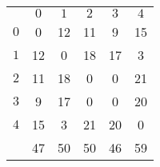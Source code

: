 
\begin{tabular}{c|ccccc|}
 \multicolumn{1}{c}{} & \multicolumn{1}{c}{$0$} & \multicolumn{1}{c}{$1$} 
  & \multicolumn{1}{c}{$2$} & \multicolumn{1}{c}{$3$} & \multicolumn{1}{c}{$4$}  \\
  \cline{2-6}
 $0$ & 0 & 12 & 11 & 9 & 15 \\
 $1$ & 12 & 0 & 18 & 17 & 3 \\
 $2$ & 11 & 18 & 0 & 0 & 21 \\
 $3$ & 9 & 17 & 0 & 0 & 20 \\
 $4$ & 15 & 3 & 21 & 20 & 0 \\
 \hhline{~*5{-}}
 \multicolumn{1}{c}{$sum$} & \cellcolor{LightCyan}47 & \cellcolor{LightCyan}50 & \cellcolor{LightCyan}50 & \cellcolor{blue!25}46 & \multicolumn{1}{c}{\cellcolor{LightCyan}59} \\
\end{tabular}